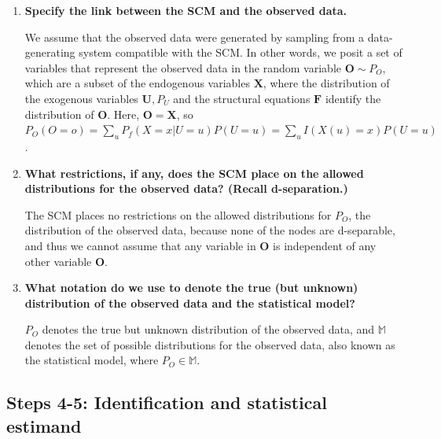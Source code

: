 \documentclass{article}\usepackage[]{graphicx}\usepackage[]{xcolor}
\begin{document}
  \begin{enumerate}[label=\textbf{\alph*.}]
  
    \item \textbf{Specify the link between the SCM and the observed data.}
    
    We assume that the observed data were generated by sampling from a data-generating system compatible with the SCM. In other words, we posit a set of variables that represent the observed data in the random variable $\bm{O} \sim P_O$, which are a subset of the endogenous variables $\bm{X}$, where the distribution of the exogenous variables $\bm{U}, P_U$ and the structural equations $\bm{F}$ identify the distribution of $\bm{O}$. Here, $\bm{O} = \bm{X}$, so $P_O(O = o) = \sum_{u} P_f(X = x | U = u)P(U = u) = \sum_{u} I(X(u) = x)P(U = u)$.
    
    \item \textbf{What restrictions, if any, does the SCM place on the allowed distributions for the observed data? (Recall d-separation.)}
    
    The SCM places no restrictions on the allowed distributions for $P_O$, the distribution of the observed data, because none of the nodes are d-separable, and thus we cannot assume that any variable in $\bm{O}$ is independent of any other variable $\bm{O}$.
    
    \item \textbf{What notation do we use to denote the true (but unknown) distribution of the observed data and the statistical model?}
    
    $P_O$ denotes the true but unknown distribution of the observed data, and $\mathbb{M}$ denotes the set of possible distributions for the observed data, also known as the statistical model, where $P_O \in \mathbb{M}$.
  
  \end{enumerate}
  
  \subsection{Steps 4-5: Identification and statistical estimand}
  
\end{document}
